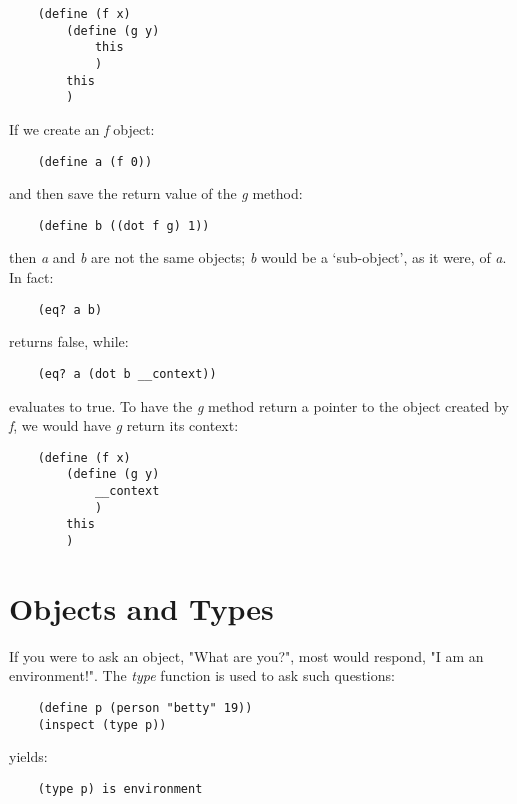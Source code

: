 \begin{verbatim}
    (define (f x)
        (define (g y)
            this
            )
        this
        )
\end{verbatim}

If we create an {\it f} object:

\begin{verbatim}
    (define a (f 0))
\end{verbatim}

and then save the return value of the {\it g} method:

\begin{verbatim}
    (define b ((dot f g) 1))
\end{verbatim}
    
then {\it a} and {\it b} are not the same objects; {\it b} would
be a `sub-object', as it were, of {\it a}. In fact:

\begin{verbatim}
    (eq? a b)
\end{verbatim}

returns false, while:

\begin{verbatim}
    (eq? a (dot b __context))
\end{verbatim}

evaluates to true. To have the {\it g} method return a pointer to the object
created by {\it f}, we would have {\it g} return its context:

\begin{verbatim}
    (define (f x)
        (define (g y)
            __context
            )
        this
        )
\end{verbatim}

\section{Objects and Types}

If you were to ask an object, "What are you?", most
would respond, "I am an environment!". The {\it type} function is
used to ask such questions:

\begin{verbatim}
    (define p (person "betty" 19))
    (inspect (type p))
\end{verbatim}

yields:

\begin{verbatim}
    (type p) is environment
\end{verbatim}

